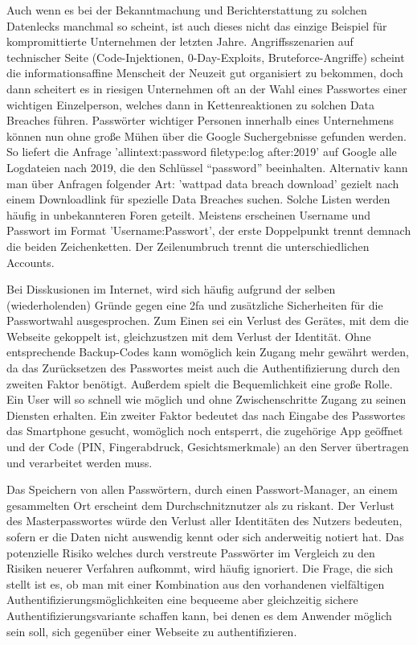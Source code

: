 Auch wenn es bei der Bekanntmachung und Berichterstattung zu solchen Datenlecks manchmal so scheint, ist auch dieses nicht das einzige Beispiel für kompromittierte Unternehmen der letzten Jahre. Angriffsszenarien auf technischer Seite (Code-Injektionen, 0-Day-Exploits, Bruteforce-Angriffe) scheint die informationsaffine Menscheit der Neuzeit gut organisiert zu bekommen, doch dann scheitert es in riesigen Unternehmen oft an der Wahl eines Passwortes einer wichtigen Einzelperson, welches dann in Kettenreaktionen zu solchen Data Breaches führen. Passwörter wichtiger Personen innerhalb eines Unternehmens können nun ohne große Mühen über die Google Suchergebnisse gefunden werden. So liefert die Anfrage 'allintext:password filetype:log after:2019' auf Google alle Logdateien nach 2019, die den Schlüssel ``password'' beeinhalten. Alternativ kann man  über Anfragen folgender Art: 'wattpad data breach download' gezielt nach einem Downloadlink für spezielle Data Breaches suchen. Solche Listen werden häufig in unbekannteren Foren geteilt. Meistens erscheinen Username und Passwort im Format 'Username:Passwort', der erste Doppelpunkt trennt demnach die beiden Zeichenketten. Der Zeilenumbruch trennt die unterschiedlichen Accounts.

Bei Disskusionen im Internet, wird sich häufig aufgrund der selben (wiederholenden) Gründe gegen eine \ac{2fa} und zusätzliche Sicherheiten für die Passwortwahl ausgesprochen. Zum Einen sei ein Verlust des Gerätes, mit dem die Webseite gekoppelt ist, gleichzustzen mit dem Verlust der Identität. Ohne entsprechende Backup-Codes kann womöglich kein Zugang mehr gewährt werden, da das Zurücksetzen des Passwortes meist auch die Authentifizierung durch den zweiten Faktor benötigt. Außerdem spielt die Bequemlichkeit eine große Rolle. Ein User will so schnell wie möglich und ohne Zwischenschritte Zugang zu seinen Diensten erhalten. Ein zweiter Faktor bedeutet das nach Eingabe des Passwortes das Smartphone gesucht, womöglich noch entsperrt, die zugehörige App geöffnet und der Code (PIN, Fingerabdruck, Gesichtsmerkmale) an den Server übertragen und verarbeitet werden muss.

Das Speichern von allen Passwörtern, durch einen Passwort-Manager, an einem gesammelten Ort erscheint dem Durchschnitznutzer als zu riskant. Der Verlust des Masterpasswortes würde den Verlust aller Identitäten des Nutzers bedeuten, sofern er die Daten nicht auswendig kennt oder sich anderweitig notiert hat. Das potenzielle Risiko welches durch verstreute Passwörter im Vergleich zu den Risiken neuerer Verfahren aufkommt, wird häufig ignoriert. Die Frage, die sich stellt ist es, ob man mit einer Kombination aus den vorhandenen vielfältigen Authentifizierungsmöglichkeiten eine bequeeme aber gleichzeitig sichere Authentifizierungsvariante schaffen kann, bei denen es dem Anwender möglich sein soll, sich gegenüber einer Webseite zu authentifizieren.

